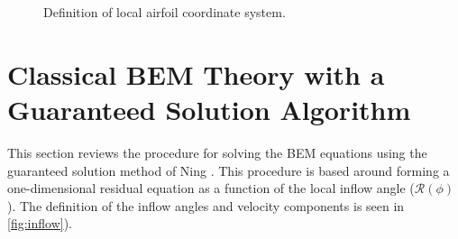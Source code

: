 \documentclass[]{aiaa-tc}%
\begin{document}

\begin{figure}[htbp]
\centering
 \qquad
 \caption{Definition of local airfoil coordinate system.}
 \label{fig:csys}
\end{figure}

\section{Classical BEM Theory with a Guaranteed Solution Algorithm}
\label {sec:BEMsolve}
This section reviews the procedure for solving the BEM equations using the guaranteed solution method of Ning \cite{Ning2013a}.  This procedure is based around forming a one-dimensional residual equation as a function of the local inflow angle ($\mathcal{R}(\phi)$).   The definition of the inflow angles and velocity components is seen in \cref{fig:inflow}).  
\end{document}
